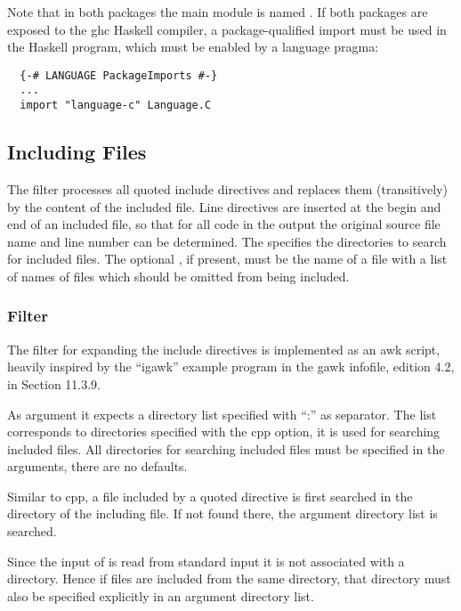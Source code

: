 Note that in both packages the main module is named . If both packages are exposed to the ghc Haskell
compiler, a package-qualified import must be used in the Haskell program, which must be enabled by a language pragma:
\begin{verbatim}
  {-# LANGUAGE PackageImports #-}
  ...
  import "language-c" Language.C
\end{verbatim}

\subsection{Including Files}
\label{impl-ccode-include}

The filter  processes all quoted include directives and replaces them (transitively) by the 
content of the included file. Line directives are inserted at the begin and end of an included file, so that
for all code in the output the original source file name and line number can be determined. The 
specifies the directories to search for included files. The optional , if present, must be the name of
a file with a list of names of files which should be omitted from being included.

\subsubsection{Filter }

The filter for expanding the include directives is implemented as an awk script, heavily inspired by the ``igawk''
example program in the gawk infofile, edition 4.2, in Section 11.3.9.

As argument it expects a directory list specified with ``:'' as separator. The list corresponds
to directories specified with the  cpp option, it is used for searching included files.
All directories for searching included files must be specified in the arguments, there are no defaults.

Similar to cpp, a file included by a quoted directive is first searched in the directory of the including file. 
If not found there, the argument directory list is searched.

Since the input of  is read from standard input it is not associated with a directory. Hence
if files are included from the same directory, that directory must also be specified explicitly in an argument directory
list.

